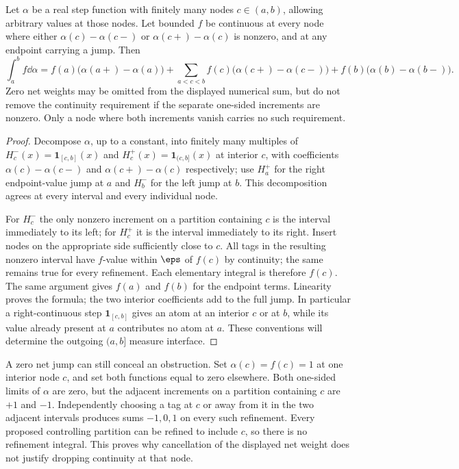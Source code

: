 \begin{theorem}
Let $\alpha$ be a real step function with finitely many nodes $c\in(a,b)$, allowing arbitrary values at those nodes. Let bounded $f$ be continuous at every node where either $\alpha(c)-\alpha(c-)$ or $\alpha(c+)-\alpha(c)$ is nonzero, and at any endpoint carrying a jump. Then
\[\int_a^b f\dd\alpha=f(a)\bigl(\alpha(a+)-\alpha(a)\bigr)
+\sum_{a<c<b}f(c)\bigl(\alpha(c+)-\alpha(c-)\bigr)
+f(b)\bigl(\alpha(b)-\alpha(b-)\bigr).\]
Zero net weights may be omitted from the displayed numerical sum, but do not remove the continuity requirement if the separate one-sided increments are nonzero. Only a node where both increments vanish carries no such requirement.
\end{theorem}
\begin{proof}
Decompose $\alpha$, up to a constant, into finitely many multiples of $H_c^-(x)=\mathbf1_{[c,b]}(x)$ and $H_c^+(x)=\mathbf1_{(c,b]}(x)$ at interior $c$, with coefficients $\alpha(c)-\alpha(c-)$ and $\alpha(c+)-\alpha(c)$ respectively; use $H_a^+$ for the right endpoint-value jump at $a$ and $H_b^-$ for the left jump at $b$. This decomposition agrees at every interval and every individual node.

For $H_c^-$ the only nonzero increment on a partition containing $c$ is the interval immediately to its left; for $H_c^+$ it is the interval immediately to its right. Insert nodes on the appropriate side sufficiently close to $c$. All tags in the resulting nonzero interval have $f$-value within $\eps$ of $f(c)$ by continuity; the same remains true for every refinement. Each elementary integral is therefore $f(c)$. The same argument gives $f(a)$ and $f(b)$ for the endpoint terms. Linearity proves the formula; the two interior coefficients add to the full jump. In particular a right-continuous step $\mathbf1_{[c,b]}$ gives an atom at an interior $c$ or at $b$, while its value already present at $a$ contributes no atom at $a$. These conventions will determine the outgoing $(a,b]$ measure interface.
\end{proof}

\begin{remark}
A zero net jump can still conceal an obstruction. Set $\alpha(c)=f(c)=1$ at one interior node $c$, and set both functions equal to zero elsewhere. Both one-sided limits of $\alpha$ are zero, but the adjacent increments on a partition containing $c$ are $+1$ and $-1$. Independently choosing a tag at $c$ or away from it in the two adjacent intervals produces sums $-1,0,1$ on every such refinement. Every proposed controlling partition can be refined to include $c$, so there is no refinement integral. This proves why cancellation of the displayed net weight does not justify dropping continuity at that node.
\end{remark}

